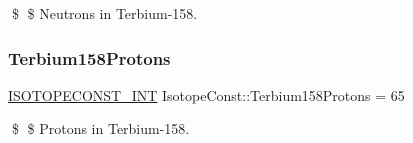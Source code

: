 \$ \$ Neutrons in Terbium-\/158. \mbox{\label{group___isotope_const-_terbium-_tb158_gacf46d664dbd1acb6b89485f6388711b8}} 
\subsubsection{\texorpdfstring{Terbium158\+Protons}{Terbium158Protons}}
{\footnotesize\ttfamily \mbox{\hyperlink{group___isotope_const-_macros_ga5f18360b3e99483a35c32d789e62621c}{I\+S\+O\+T\+O\+P\+E\+C\+O\+N\+S\+T\+\_\+\+I\+NT}} Isotope\+Const\+::\+Terbium158\+Protons = 65}

\$ \$ Protons in Terbium-\/158. 